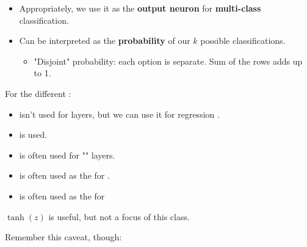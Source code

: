 \begin{itemize}
\begin{itemize}
                    \item Appropriately, we use it as the \textbf{output neuron} for \textbf{multi-class} classification.
                    
                    \item Can be interpreted as the \textbf{probability} of our $k$ possible classifications.
                        \begin{itemize}
                            \item "Disjoint" probability: each option is separate. Sum of the rows adds up to 1.\\
                        \end{itemize}
                \end{itemize}
        \end{itemize}
        
        \begin{concept}
            For the different :
            
            \begin{itemize}
                \item {} isn't used for  layers, but we can use it for regression .
                
                \item {} is  used.
                
                \item {} is often used for "" layers.
                
                \item {} is often used as the  for .
                
                \item {} is often used as the  for  
            \end{itemize}
            $\tanh(z)$ is useful, but not a focus of this class.
        \end{concept}

        Remember this caveat, though:

